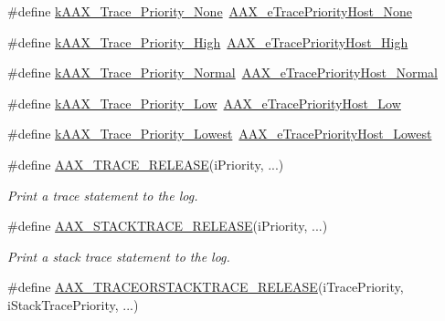 \begin{DoxyCompactItemize}
\item 
\#define \mbox{\hyperlink{a00395_a262e3b6568764baa53f893d9dc6bbc23}{k\+A\+A\+X\+\_\+\+Trace\+\_\+\+Priority\+\_\+\+None}}~\mbox{\hyperlink{a00491_a2dd667e4dea5781f38832fd9f1725f1ba906b1198b124fa17cd5821cbb140a63f}{A\+A\+X\+\_\+e\+Trace\+Priority\+Host\+\_\+\+None}}
\item 
\#define \mbox{\hyperlink{a00395_a5edd9a4ac559a4ef99a948c2ebd422db}{k\+A\+A\+X\+\_\+\+Trace\+\_\+\+Priority\+\_\+\+High}}~\mbox{\hyperlink{a00491_a2dd667e4dea5781f38832fd9f1725f1baac76cc64a1379931edbc2bdc0f8aad66}{A\+A\+X\+\_\+e\+Trace\+Priority\+Host\+\_\+\+High}}
\item 
\#define \mbox{\hyperlink{a00395_a8a6953f26f36747357d5d95f96dcf68d}{k\+A\+A\+X\+\_\+\+Trace\+\_\+\+Priority\+\_\+\+Normal}}~\mbox{\hyperlink{a00491_a2dd667e4dea5781f38832fd9f1725f1ba327226d6962ad7f297506697c2001ce0}{A\+A\+X\+\_\+e\+Trace\+Priority\+Host\+\_\+\+Normal}}
\item 
\#define \mbox{\hyperlink{a00395_abd6b80f2e0a26581086b21b7e7ad0ce9}{k\+A\+A\+X\+\_\+\+Trace\+\_\+\+Priority\+\_\+\+Low}}~\mbox{\hyperlink{a00491_a2dd667e4dea5781f38832fd9f1725f1ba78edfc70bf7ba33fc5277e4146498c17}{A\+A\+X\+\_\+e\+Trace\+Priority\+Host\+\_\+\+Low}}
\item 
\#define \mbox{\hyperlink{a00395_a68d0297c90a8d294e19ea781f8cda96a}{k\+A\+A\+X\+\_\+\+Trace\+\_\+\+Priority\+\_\+\+Lowest}}~\mbox{\hyperlink{a00491_a2dd667e4dea5781f38832fd9f1725f1baf101af483c232de54b31eba274a07c4c}{A\+A\+X\+\_\+e\+Trace\+Priority\+Host\+\_\+\+Lowest}}
\item 
\#define \mbox{\hyperlink{a00395_ac2aa820ece56bb59140ad561218db4b3}{A\+A\+X\+\_\+\+T\+R\+A\+C\+E\+\_\+\+R\+E\+L\+E\+A\+SE}}(i\+Priority, ...)
\begin{DoxyCompactList}\small\item\em Print a trace statement to the log. \end{DoxyCompactList}\item 
\#define \mbox{\hyperlink{a00395_a51f7dcc4ce960ab8855ec97f031a1463}{A\+A\+X\+\_\+\+S\+T\+A\+C\+K\+T\+R\+A\+C\+E\+\_\+\+R\+E\+L\+E\+A\+SE}}(i\+Priority, ...)
\begin{DoxyCompactList}\small\item\em Print a stack trace statement to the log. \end{DoxyCompactList}\item 
\#define \mbox{\hyperlink{a00395_a74f610a8e4359a5fc3eae89be3eb3a4b}{A\+A\+X\+\_\+\+T\+R\+A\+C\+E\+O\+R\+S\+T\+A\+C\+K\+T\+R\+A\+C\+E\+\_\+\+R\+E\+L\+E\+A\+SE}}(i\+Trace\+Priority,  i\+Stack\+Trace\+Priority, ...)

\end{DoxyCompactItemize}
